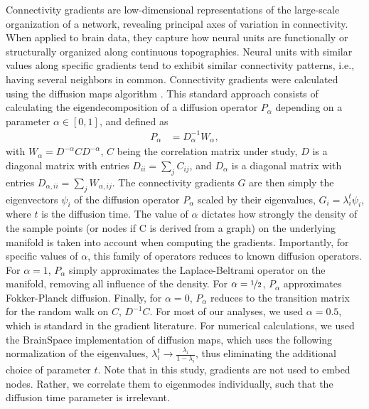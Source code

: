 \documentclass{article}
\begin{document}
Connectivity gradients are low-dimensional representations of the large-scale organization of a network, revealing principal axes of variation in connectivity. When applied to brain data, they capture how neural units are functionally or structurally organized along continuous topographies.\cite{margulies2016situating} Neural units with similar values along specific gradients tend to exhibit similar connectivity patterns, i.e., having several neighbors in common. Connectivity gradients were calculated using the diffusion maps algorithm \cite{Coifman2006}. This standard approach consists of calculating the eigendecomposition of a diffusion operator $P_\alpha$ depending on a parameter $\alpha \in [0, 1]$, and defined as 
\begin{align*}
    P_\alpha &= D_\alpha^{-1}W_{\alpha},
\end{align*}
with $W_{\alpha} = D^{-\alpha} C D^{-\alpha}$, $C$ being the correlation matrix under study, $D$ is a diagonal matrix with entries $D_{i i} = \sum_{j}C_{ij}$, and $D_\alpha$ is a diagonal matrix with entries $D_{\alpha,i i} = \sum_{j}W_{\alpha, ij}$. The connectivity gradients $G$ are then simply the eigenvectors $\psi_i$ of the diffusion operator $P_\alpha$ scaled by their eigenvalues, $G_i=\lambda_i^t\psi_i$, where $t$ is the diffusion time. The value of $\alpha$ dictates how strongly the density of the sample points (or nodes if C is derived from a graph) on the underlying manifold is taken into account when computing the gradients. Importantly, for specific values of $\alpha$, this family of operators reduces to known diffusion operators. For $\alpha = 1$, $P_\alpha$ simply approximates the Laplace-Beltrami operator on the manifold, removing all influence of the density. For $\alpha = \nicefrac{1}{2}$, $P_\alpha$ approximates Fokker-Planck diffusion. Finally, for $\alpha = 0$, $P_\alpha$ reduces to the transition matrix for the random walk on $C$, $D^{-1}C$. For most of our analyses, we used $\alpha=0.5$, which is standard in the gradient literature. For numerical calculations, we used the BrainSpace implementation of diffusion maps\cite{vos2020brainspace}, which uses the following normalization of the eigenvalues, $\lambda_i^t\to \frac{\lambda_i}{1 - \lambda_i}$, thus eliminating the additional choice of parameter $t$. Note that in this study, gradients are not used to embed nodes. Rather, we correlate them to eigenmodes individually, such that the diffusion time parameter is irrelevant.
\end{document}
